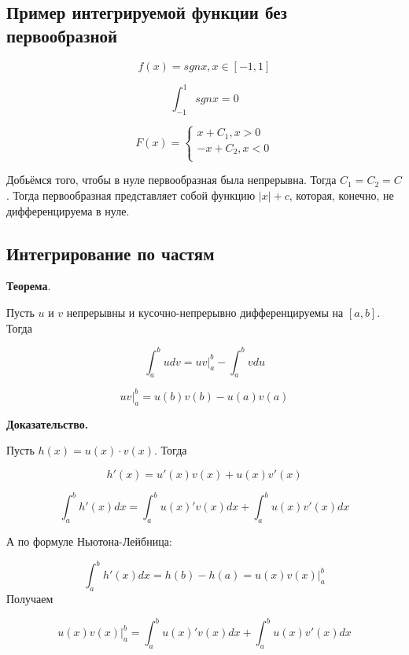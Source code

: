 \documentclass[a4paper]{article}
\begin{document}
\begin{definit}
\hypertarget{p15}{}
\subsection*{Пример интегрируемой функции без первообразной}

\[
f(x) = sgn x, x \in [-1,1]
\]

\[
\int_{-1}^1 sgn x = 0
\]

\[
F(x) = \begin{cases}
x+C_1, x>0\\
-x+C_2, x<0\\
\end{cases}
\]

Добьёмся того, чтобы в нуле первообразная была непрерывна. Тогда $C_1 = C_2 = C$. Тогда первообразная представляет собой функцию $|x|+c$, которая, конечно, не дифференцируема в нуле.
\end{definit}


\begin{definit}
\hypertarget{p16}{}
\subsection*{Интегрирование по частям}

\begin{htheorem}\textbf{Теорема}.

Пусть $u$ и $v$ непрерывны и кусочно-непрерывно дифференцируемы на $[a,b]$. Тогда

\[
\int_a^b udv = uv \bigg|_a^b - \int_a^b vdu
\]

\[
uv \bigg|_a^b = u(b)v(b) - u(a)v(a)
\]
\end{htheorem}

\begin{hproof}\textbf{Доказательство.}

Пусть $h(x) = u(x) \cdot v(x)$.
Тогда 

\[
h'(x) = u'(x)v(x) + u(x)v'(x)
\]

\[
\int_a^b h'(x)dx = \int_a^b u(x)'v(x)dx + \int_a^b u(x)v'(x)dx
\]

А по формуле Ньютона-Лейбница:

\[
\int_a^b h'(x)dx = h(b) - h(a) = u(x)v(x) \bigg|_a^b
\]
Получаем 

\[
u(x)v(x) \bigg|_a^b = \int_a^b u(x)'v(x)dx + \int_a^b u(x)v'(x)dx
\]
\end{hproof}
\end{definit}
\end{document}
